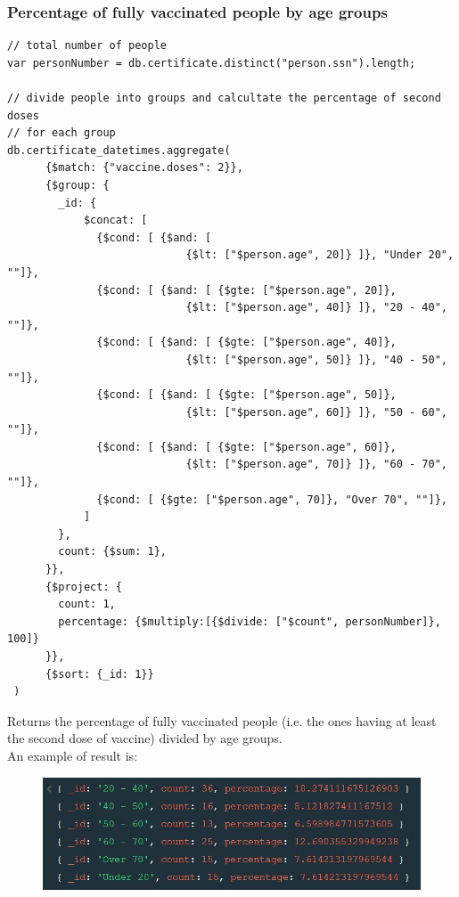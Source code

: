\documentclass[12pt, a4paper]{article}
\begin{document}
\subsubsection{Percentage of fully vaccinated people by age groups}
\begin{tcolorbox}[fontupper=\scriptsize]
    \begin{verbatim}
// total number of people
var personNumber = db.certificate.distinct("person.ssn").length;

// divide people into groups and calcultate the percentage of second doses 
// for each group 
db.certificate_datetimes.aggregate(
      {$match: {"vaccine.doses": 2}},
      {$group: {
        _id: {
            $concat: [
              {$cond: [ {$and: [ 
                            {$lt: ["$person.age", 20]} ]}, "Under 20", ""]},
              {$cond: [ {$and: [ {$gte: ["$person.age", 20]}, 
                            {$lt: ["$person.age", 40]} ]}, "20 - 40", ""]},
              {$cond: [ {$and: [ {$gte: ["$person.age", 40]}, 
                            {$lt: ["$person.age", 50]} ]}, "40 - 50", ""]},
              {$cond: [ {$and: [ {$gte: ["$person.age", 50]}, 
                            {$lt: ["$person.age", 60]} ]}, "50 - 60", ""]},
              {$cond: [ {$and: [ {$gte: ["$person.age", 60]}, 
                            {$lt: ["$person.age", 70]} ]}, "60 - 70", ""]},
              {$cond: [ {$gte: ["$person.age", 70]}, "Over 70", ""]},
            ]
        },
        count: {$sum: 1},
      }},
      {$project: {
        count: 1,
        percentage: {$multiply:[{$divide: ["$count", personNumber]}, 100]}
      }},
      {$sort: {_id: 1}}
 )
    \end{verbatim}
\end{tcolorbox}
\noindent 
Returns the percentage of fully vaccinated people (i.e. the ones having at least the 
second dose of vaccine) divided by age groups.\\
An example of result is:
\begin{figure}[ht]
    \centering
    \includegraphics[width=.8\linewidth]{vaccinations_per_age_groups.jpg}
\end{figure}
\end{document}
